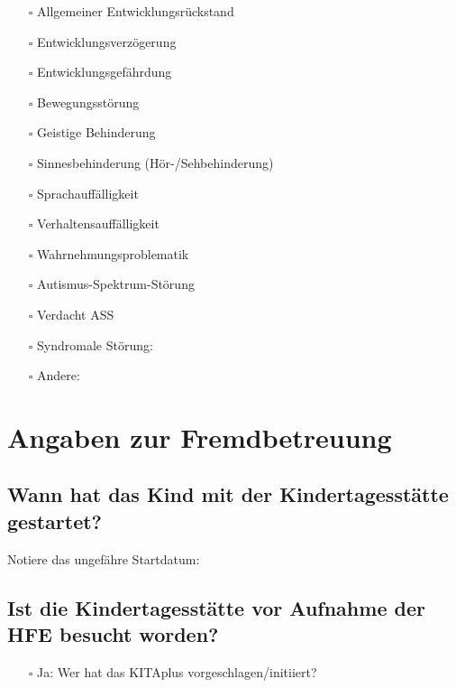 \documentclass[
  ngerman,
  11pt,
  paper=a4,
  twoside,
  titlepage=true,
  openright,
  abstract=on,
  toc=listofnumbered,
  numbers=noenddot,
  chapterprefix=true,
  headings=optiontohead,
  svgnames,
  dvipsnames]{scrreprt}
\providecommand{\tightlist}{%
  \setlength{\itemsep}{0pt}\setlength{\parskip}{0pt}}
\begin{document}
\begin{itemize}
\tightlist
\item[$\square$]
  Allgemeiner Entwicklungsrückstand
\item[$\square$]
  Entwicklungsverzögerung
\item[$\square$]
  Entwicklungsgefährdung
\item[$\square$]
  Bewegungsstörung
\item[$\square$]
  Geistige Behinderung
\item[$\square$]
  Sinnesbehinderung (Hör-/Sehbehinderung)
\item[$\square$]
  Sprachauffälligkeit
\item[$\square$]
  Verhaltensauffälligkeit
\item[$\square$]
  Wahrnehmungsproblematik
\item[$\square$]
  Autismus-Spektrum-Störung
\item[$\square$]
  Verdacht ASS
\item[$\square$]
  Syndromale Störung: \xhrulefill[,fill=8cm,thickness=0.5pt]
\item[$\square$]
  Andere: \xhrulefill[,fill=8cm,thickness=0.5pt]
\end{itemize}

\hypertarget{angaben-zur-fremdbetreuung-1}{%
\section*{Angaben zur
Fremdbetreuung}\label{angaben-zur-fremdbetreuung-1}}

\hypertarget{wann-hat-das-kind-mit-der-kindertagesstuxe4tte-gestartet}{%
\subsection*{Wann hat das Kind mit der Kindertagesstätte
gestartet?}\label{wann-hat-das-kind-mit-der-kindertagesstuxe4tte-gestartet}}

Notiere das ungefähre Startdatum: \xhrule[,fill=3cm,thickness=0.5pt]

\hypertarget{ist-die-kindertagesstuxe4tte-vor-aufnahme-der-hfe-besucht-worden}{%
\subsection*{Ist die Kindertagesstätte vor Aufnahme der HFE besucht
worden?}\label{ist-die-kindertagesstuxe4tte-vor-aufnahme-der-hfe-besucht-worden}}

\begin{itemize}
\tightlist
\item[$\square$]
  Ja: Wer hat das KITAplus vorgeschlagen/initiiert?
\end{itemize}
\end{document}
